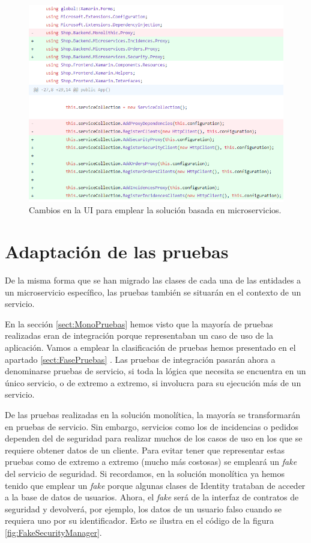 \documentclass[11pt,spanish,listoffigures]{tfgetsinf}
\begin{document}
\begin{figure}[h]
\centering
\includegraphics[scale=0.9]{ChangesUI}
\caption{Cambios en la UI para emplear la solución basada en microservicios.}
\label{fig:ChangesUI}
\end{figure}

\section{Adaptación de las pruebas}

De la misma forma que se han migrado las clases de cada una de las entidades a un microservicio específico, las pruebas también se situarán en el contexto de un servicio.

En la sección \ref{sect:MonoPruebas}  hemos visto que la mayoría de pruebas realizadas eran de integración porque representaban un caso de uso de la aplicación. Vamos a emplear la clasificación de pruebas hemos presentado en el apartado \ref{sect:FasePruebas} . Las pruebas de integración pasarán ahora a denominarse pruebas de servicio, si toda la lógica que necesita se encuentra en un único servicio, o de extremo a extremo, si involucra para su ejecución más de un servicio.

De las pruebas realizadas en la solución monolítica, la mayoría se transformarán en pruebas de servicio. Sin embargo, servicios como los de incidencias o pedidos dependen del de seguridad para realizar muchos de los casos de uso en los que se requiere obtener datos de un cliente. Para evitar tener que representar estas pruebas como de extremo a extremo (mucho más costosas) se empleará un \textit{fake} del servicio de seguridad. Si recordamos, en la solución monolítica ya hemos tenido que emplear un \textit{fake} porque algunas clases de Identity trataban de acceder a la base de datos de usuarios. Ahora, el \textit{fake} será de la interfaz de contratos de seguridad y devolverá, por ejemplo, los datos de un usuario falso cuando se requiera uno por su identificador. Esto se ilustra en el código de la figura \ref{fig:FakeSecurityManager}.
\end{document}
